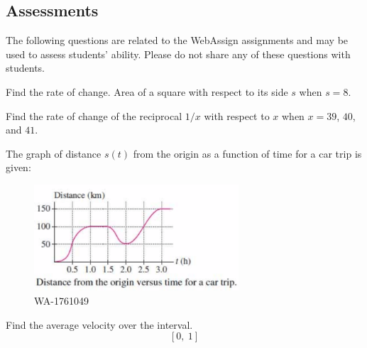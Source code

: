 \documentclass[12pt,addpoints, answers, fleqn]{exam}
\begin{document}
\begin{teacher}
\subsection{Assessments}
The following questions are related to the WebAssign assignments and may be used to assess students' ability. Please do not share any of these questions with students.
\begin{questions}		
\question 	%

Find the rate of change. Area of a square with respect to its side $s$ when $s = 8$.


\question 	%

Find the rate of change of the reciprocal $1/x$ with respect to $x$ when $x = 39$, $40$, and $41$.
 
 
 
\question 	%

The graph of distance $s\left(t\right)$ from the origin as a function of time for a car trip is given:
 \begin{figure}[htbp] %
    \centering
    \includegraphics[width=3in]{./graphics/1761049.pdf} 
    \caption{WA-1761049}
    \label{fig:1761049}
 \end{figure}

Find the average velocity over the interval.
\[
\left[0, \ 1 \right]
\]


\end{questions}
\end{teacher}
\end{document}
